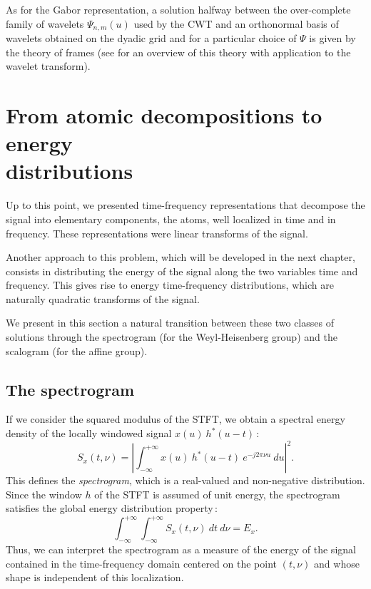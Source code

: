   As for the Gabor representation, a solution halfway between the
over-complete family of wavelets ${\Psi_{n,m}(u)}$ used by the CWT and an
orthonormal basis of wavelets obtained on the dyadic grid and for a
particular choice of $\Psi$ is given by the theory of frames (see
\cite{DAU92} for an overview of this theory with application to the wavelet
transform).



\section{From atomic decompositions to energy\\ distributions}
  Up to this point, we presented time-frequency representations that
decompose the signal into elementary components, the atoms, well localized
in time and in frequency. These representations were linear transforms of
the signal.

  Another approach to this problem, which will be developed in the next
chapter, consists in distributing the energy of the signal along the two
variables time and frequency. This gives rise to energy time-frequency
distributions, which are naturally quadratic transforms of the signal.

  We present in this section a natural transition between these two
classes of solutions through the spectrogram (for the Weyl-Heisenberg
group) and the scalogram (for the affine group).

\subsection{The spectrogram}
  If we consider the squared modulus of the STFT, we obtain a spectral
energy density of the locally windowed signal $x(u)\ h^*(u-t)$\,:
\[S_x(t,\nu) = \left|\int_{-\infty}^{+\infty} x(u)\ h^*(u-t)\ e^{-j2\pi \nu
u}\ du\right|^2.\] This defines the {\it spectrogram}, which is a
real-valued and non-negative distribution. Since the window $h$ of the STFT
is assumed of unit energy, the spectrogram satisfies the global energy
distribution property\,:
\[\int_{-\infty}^{+\infty} \int_{-\infty}^{+\infty} S_x(t,\nu)\ dt\ d\nu =
E_x.\] 
Thus, we can interpret the spectrogram as a measure of the energy of the signal
contained in the time-frequency domain centered on the point $(t,\nu)$ and
whose shape is independent of this localization.

